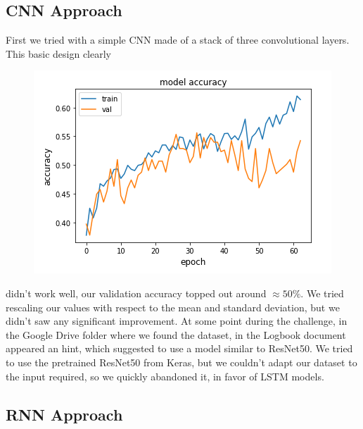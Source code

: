 \documentclass[a4paper,11pt]{article}
\numberwithin{equation}{section}
\begin{document}
\subsection*{CNN Approach}
First we tried with a simple CNN made of a stack of three convolutional layers. This basic design clearly
\begin{figure}
    \includegraphics*[scale=0.3]{model_cnn.png}
\end{figure} didn't work well, our validation accuracy topped out around \(\approx 50\%\). 
We tried rescaling our values with respect to the mean and standard deviation, but we didn't saw any significant improvement. At some point during the challenge, in the Google Drive folder where we found the dataset, in the Logbook document appeared an hint, which suggested to use a model similar to ResNet50. We tried to use the pretrained ResNet50 from Keras, but we couldn't adapt our dataset to the input required, so we quickly abandoned it, in favor of LSTM models.
\subsection*{RNN Approach}
\end{document}
